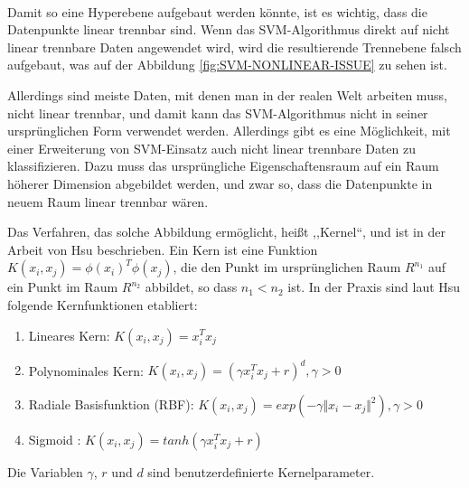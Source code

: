\paragraph{}
Damit so eine Hyperebene aufgebaut werden könnte, ist es wichtig, dass die Datenpunkte linear trennbar sind. Wenn das SVM-Algorithmus direkt auf nicht linear trennbare Daten angewendet wird, wird die resultierende Trennebene falsch aufgebaut, was auf der Abbildung \ref{fig:SVM-NONLINEAR-ISSUE} zu sehen ist. 

Allerdings sind meiste Daten, mit denen man in der realen Welt arbeiten muss, nicht linear trennbar, und damit kann das SVM-Algorithmus nicht in seiner ursprünglichen Form verwendet werden. Allerdings gibt es eine Möglichkeit, mit einer Erweiterung von SVM-Einsatz auch nicht linear trennbare Daten zu klassifizieren. Dazu muss das ursprüngliche Eigenschaftensraum auf ein Raum höherer Dimension abgebildet werden, und zwar so, dass die Datenpunkte in neuem Raum linear trennbar wären\cite{Hearst:98}.

Das Verfahren, das solche Abbildung ermöglicht, heißt ,,Kernel``, und ist in der Arbeit von Hsu\cite{hsu2003practical} beschrieben. Ein Kern ist eine Funktion 
$K(x_i,x_j) = \phi(x_i)^T \phi(x_j)$, die den Punkt im ursprünglichen Raum $R^{n_1}$ auf ein Punkt im Raum $R^{n_2}$ abbildet, so dass $n_1 < n_2$ ist. In der Praxis sind laut Hsu\cite{hsu2003practical} folgende Kernfunktionen etabliert:
\begin{enumerate}
\item Lineares Kern: $K(x_i,x_j) = x_i^T x_j$
\item Polynominales Kern: $K(x_i,x_j) = (\gamma x_i^T x_j + r)^d, \gamma > 0$
\item Radiale Basisfunktion (RBF): $K(x_i,x_j) = exp(-\gamma \Vert x_i - x_j \Vert^2), \gamma > 0$
\item Sigmoid : $K(x_i,x_j) = tanh(\gamma x_i^T x_j + r)$
\end{enumerate}
Die Variablen $\gamma$, $r$ und $d$ sind benutzerdefinierte Kernelparameter.

